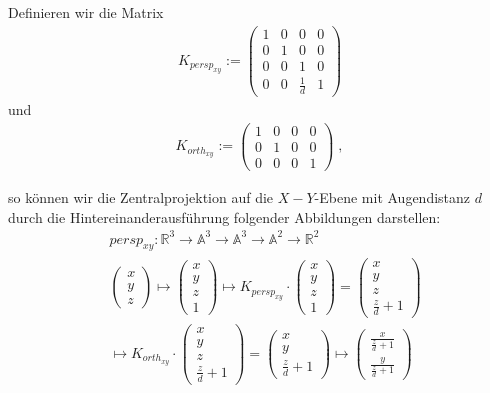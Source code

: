 Definieren wir die Matrix 
\begin{align*}
K_{persp_{xy}} := \begin{pmatrix}  
1   &  0 & 0 & 0  \\
0   &  1 & 0 & 0  \\
0   &  0 & 1 & 0  \\
0   &  0 & \frac{1}{d} & 1  
\end{pmatrix} 
\end{align*}
und 
\begin{align*}
K_{orth_{xy}} := \begin{pmatrix}  
1   &  0 & 0 & 0  \\
0   &  1 & 0 & 0  \\
0   &  0 & 0 & 1  
\end{pmatrix} \; ,
\end{align*}


so können wir die Zentralprojektion auf die $X-Y$-Ebene mit Augendistanz $d$ durch die Hintereinanderausführung folgender Abbildungen darstellen:
\begin{align*}
& persp_{xy} :\mathbb{R}^3   \to \mathbb{A}^3    \to  \mathbb{A}^3    \to \mathbb{A}^2    \to \mathbb{R}^2  \\
&\begin{pmatrix} x \\ y \\ z \end{pmatrix} \mapsto \begin{pmatrix} x \\ y \\ z \\ 1 \end{pmatrix}   \mapsto K_{persp_{xy}} \cdot  \begin{pmatrix} x \\ y \\ z \\ 1 \end{pmatrix} =   \begin{pmatrix} x \\ y \\ z \\ \frac{z}{d} + 1 \end{pmatrix} \\
 & \mapsto K_{orth_{xy}} \cdot   \begin{pmatrix} x \\ y \\ z \\ \frac{z}{d} + 1 \end{pmatrix}=   \begin{pmatrix} x \\ y \\ \frac{z}{d} + 1 \end{pmatrix}   \mapsto 
 \begin{pmatrix}  \frac{x}{\frac{z}{d} +1 } \\   \frac{y}{\frac{z}{d} +1 } \end{pmatrix}
 \end{align*}
